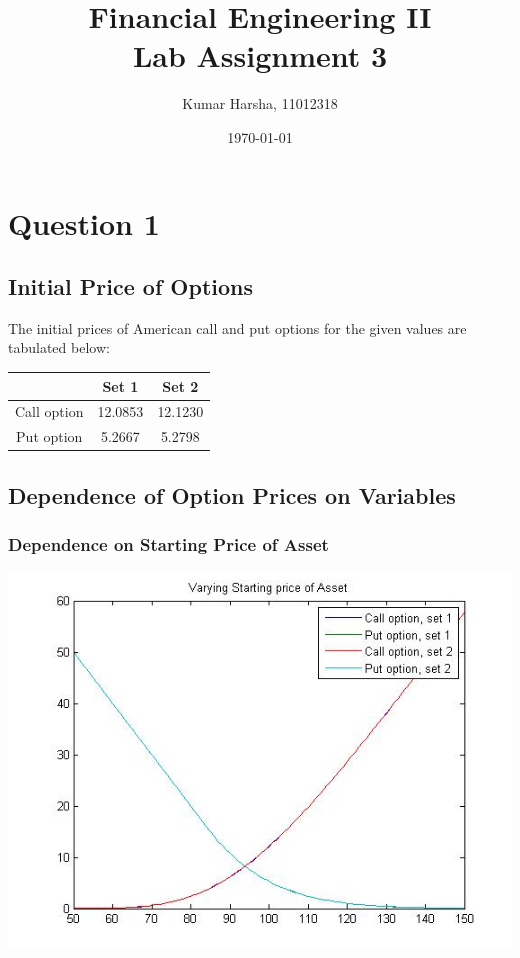 \documentclass[12pt]{article}
\begin{document}
\title{Financial Engineering II\\Lab Assignment 3}
\author{Kumar Harsha, 11012318}
\date{\today}
\maketitle
\tableofcontents
\newpage

\section{Question 1}
  \subsection*{Initial Price of Options}
  The initial prices of American call and put options for the given values are tabulated below:
  \begin{center}
  \begin{tabular}{c|c|c}
   &Set 1 &Set 2\\ \hline
  Call option &12.0853 &12.1230\\
  Put option &5.2667 &5.2798\\ \hline
  \end{tabular}
  \end{center}
  
  \subsection*{Dependence of Option Prices on Variables}
    \subsubsection*{Dependence on Starting Price of Asset}
    \begin{center}
      \includegraphics[width=6in]{start.jpg}
    \end{center}
\end{document}
